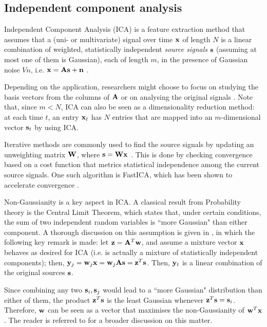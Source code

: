 \documentclass[../main.tex]{subfiles} \label{chapter_soa}
\begin{document}
\subsection{Independent component analysis} \label{subsection_ica}
Independent Component Analysis (ICA) is a feature extraction method that assumes that a (uni- or multivariate) signal over time $\mathbf{x}$ of length $N$ is a linear combination of weighted, statistically independent \emph{source signals} $\mathbf{s}$ (assuming at most one of them is Gaussian), each of length $m$, in the presence of Gaussian noise $V{n}$, i.e. $\mathbf{x} = \mathbf{As} + \mathbf{n}$ \cite{Kasprzak}.
\par Depending on the application, researchers might choose to focus on studying the basis vectors from the columns of $\mathbf{A}$ or on analysing the original signals \cite{Kasprzak,Hsieh2009,Chien2006,Jang2001}. Note that, since $m<N$, ICA can also be seen as a dimensionality reduction method: at each time $t$, an entry $\mathbf{x}_t$ has $N$ entries that are mapped into an $m$-dimensional vector $\mathbf{s}_t$ by using ICA. 
\par Iterative methods are commonly used to find the source signals by updating an unweighting matrix $\mathbf{W}$, where $\mathbf{s} = \mathbf{Wx}$ \cite{Hyvarinen2000}. This is done by checking convergence based on a cost function that metrics statistical independence among the current source signals. One such algorithm is FastICA, which has been shown to accelerate convergence \cite{Hyvarinen2000, Kasprzak}. 
\par Non-Gaussianity is a key aspect in ICA. A classical result from Probability theory is the Central Limit Theorem, which states that, under certain conditions, the sum of two independent random variables is ``more Gaussian" than either component. A thorough discussion on this assumption is given in \cite{Hyvarinen2000}, in which the following key remark is made: let $\mathbf{z} = \mathbf{A}^T\mathbf{w}$, and assume a mixture vector $\mathbf{x}$ behaves as desired for ICA (i.e. is actually a mixture of statistically independent components); then, $\mathbf{y}_j = \mathbf{w}_j\mathbf{x} = \mathbf{w}_j\mathbf{As} = \mathbf{z}^T\mathbf{s}$. Then, $\mathbf{y}_t$ is a linear combination of the original sources $\mathbf{s}$. 
\par Since combining any two $\mathbf{s}_i, \mathbf{s}_j$ would lead to a ``more Gaussian" distribution than either of them, the product $\mathbf{z}^T\mathbf{s}$ is the least Gaussian whenever $\mathbf{z}^T\mathbf{s} = \mathbf{s}_i$. Therefore, $\mathbf{w}$ can be seen as a vector that maximises the non-Gaussianity of $\mathbf{w}^T\mathbf{x}$. The reader is referred to \cite{Hyvarinen2000} for a broader discussion on this matter.
\end{document}
